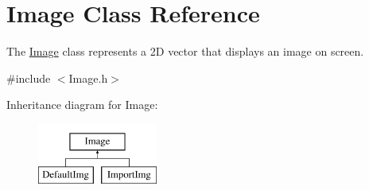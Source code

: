 \hypertarget{classImage}{\section{Image Class Reference}
\label{classImage}
}


The \hyperlink{classImage}{Image} class represents a 2\-D vector that displays an image on screen.  




{\ttfamily \#include $<$Image.\-h$>$}

Inheritance diagram for Image\-:\begin{figure}[H]
\begin{center}
\leavevmode
\includegraphics[height=2.000000cm]{classImage}
\end{center}
\end{figure}
